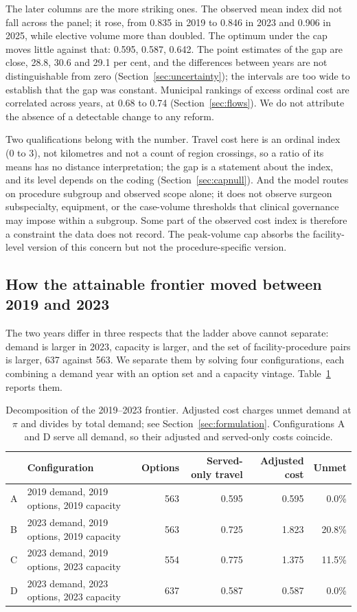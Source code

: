 The later columns are the more striking ones. The observed mean index did not fall
across the panel; it rose, from 0.835 in 2019 to 0.846 in 2023 and 0.906 in
2025, while elective volume more than doubled. The optimum under the
cap moves little against that: 0.595, 0.587, 0.642. The point estimates of the
gap are close, 28.8, 30.6 and 29.1 per cent, and the differences between years
are not distinguishable from zero (Section~\ref{sec:uncertainty}); the intervals are too
wide to establish that the gap was constant. Municipal rankings of excess ordinal cost
are correlated across years, at 0.68 to 0.74 (Section~\ref{sec:flows}). We do not
attribute the absence of a detectable change to any reform.

Two qualifications belong with the number. Travel cost here is an ordinal index (0 to 3), not kilometres and not a count of region
crossings, so a ratio of its means has no distance interpretation; the gap is a statement about
the index, and its level depends on the coding (Section~\ref{sec:capnull}). And the model routes on procedure
subgroup and observed scope alone; it does not observe surgeon subspecialty,
equipment, or the case-volume thresholds that clinical governance may impose
within a subgroup. Some part of the observed cost index is therefore a constraint the
data does not record. The peak-volume cap absorbs the facility-level version of
this concern but not the procedure-specific version.

\subsection{How the attainable frontier moved between 2019 and 2023}
\label{sec:decomp}

The two years differ in three respects that the ladder above cannot separate:
demand is larger in 2023, capacity is larger, and the set of facility-procedure
pairs is larger, 637 against 563. We separate them by solving four
configurations, each combining a demand year with an option set and a capacity
vintage. Table~\ref{tab:decomp} reports them.

\begin{table}[t]
\centering
\caption{Decomposition of the 2019--2023 frontier. Adjusted cost charges unmet
demand at $\pi$ and divides by total demand; see Section~\ref{sec:formulation}.
Configurations A and D serve all demand, so their adjusted and served-only costs
coincide.}
\label{tab:decomp}
\begin{tabular}{llrrrr}
\toprule
& Configuration & Options & Served-only travel & Adjusted cost & Unmet \\
\midrule
A & 2019 demand, 2019 options, 2019 capacity & 563 & 0.595 & 0.595 & 0.0\% \\
B & 2023 demand, 2019 options, 2019 capacity & 563 & 0.725 & 1.823 & 20.8\% \\
C & 2023 demand, 2019 options, 2023 capacity & 554 & 0.775 & 1.375 & 11.5\% \\
D & 2023 demand, 2023 options, 2023 capacity & 637 & 0.587 & 0.587 & 0.0\% \\
\bottomrule
\end{tabular}
\end{table}


